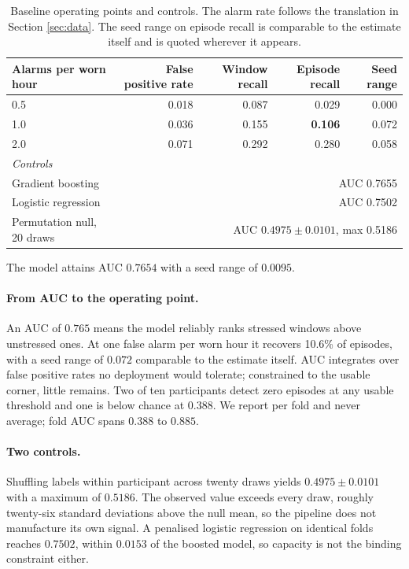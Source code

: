 \documentclass{article}
\begin{document}
\begin{table}[t]
\caption{Baseline operating points and controls. The alarm rate follows the
translation in Section \ref{sec:data}. The seed range on episode recall is
comparable to the estimate itself and is quoted wherever it appears.}
\label{tab:baseline}
\centering
\small
\begin{tabular}{lrrrr}
\toprule
Alarms per worn hour & False positive rate & Window recall & Episode recall & Seed range \\
\midrule
0.5 & 0.018 & 0.087 & 0.029 & 0.000 \\
1.0 & 0.036 & 0.155 & \textbf{0.106} & 0.072 \\
2.0 & 0.071 & 0.292 & 0.280 & 0.058 \\
\midrule
\multicolumn{5}{l}{\emph{Controls}} \\
Gradient boosting & \multicolumn{4}{r}{AUC 0.7655} \\
Logistic regression & \multicolumn{4}{r}{AUC 0.7502} \\
Permutation null, 20 draws & \multicolumn{4}{r}{AUC $0.4975 \pm 0.0101$, max 0.5186} \\
\bottomrule
\end{tabular}
\end{table}

The model attains AUC $0.7654$ with a seed range of $0.0095$.

\paragraph{From AUC to the operating point.} An AUC of $0.765$ means the model reliably
ranks stressed windows above unstressed ones. At one false alarm per worn hour
it recovers 10.6\% of episodes, with a seed range of $0.072$ comparable to the
estimate itself. AUC integrates over false positive rates no deployment would
tolerate; constrained to the usable corner, little remains. Two of ten
participants detect zero episodes at any usable threshold and one is below
chance at $0.388$. We report per fold and never average; fold AUC spans $0.388$
to $0.885$.

\paragraph{Two controls.} Shuffling labels within participant across twenty
draws yields $0.4975 \pm 0.0101$ with a maximum of $0.5186$. The observed value
exceeds every draw, roughly twenty-six standard deviations above the null mean,
so the pipeline does not manufacture its own signal. A penalised logistic
regression on identical folds reaches $0.7502$, within $0.0153$ of the boosted
model, so capacity is not the binding constraint either.
\end{document}
